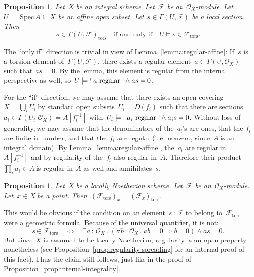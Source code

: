 \documentclass[10pt,reqno,a4paper]{amsbook}
\makeatletter
\theoremstyle{definition}
\theoremstyle{plain}
\newtheorem{prop}[defn]{Proposition}
\theoremstyle{remark}
\newcommand{\F}{\mathcal{F}}
\renewcommand{\O}{\mathcal{O}}
\let\oldul\ul
\renewcommand{\ul}[1]{\text{\oldul{$#1$}}}
\newcommand{\tors}{\mathrm{tors}}
\DeclareMathOperator{\Spec}{Spec}
\newcommand{\?}{\,{:}\,}
\renewcommand{\_}{\mathpunct{.}\,}
\newcommand{\speak}[1]{\ulcorner\text{\textnormal{#1}}\urcorner}
\newcommand{\ie}{i.\,e.\@\xspace}
\renewenvironment{proof}[1][\proofname]{\par
  \pushQED{\qed}%
  \normalfont \topsep6\p@\@plus6\p@\relax
  \trivlist
  \item[\hskip\labelsep
        \itshape
    #1\@addpunct{.}]\ignorespaces
}{%
  \popQED\endtrivlist\@endpefalse
}
\makeatother
\begin{document}
\begin{prop}\label{prop:torsion-int-ext}Let~$X$ be an integral scheme. Let~$\F$ be an~$\O_X$-module. Let~$U
= \Spec A \subseteq X$ be an affine open subset. Let~$s \in \Gamma(U,\F)$ be a local
section. Then
\[ s \in \Gamma(U,\F)_\tors \quad\text{if and only if}\quad
  U \models s \in \F_\tors. \]
\end{prop}
\begin{proof}
The ``only if'' direction is trivial in view of
Lemma~\ref{lemma:regular-affine}: If~$s$ is a torsion element
of~$\Gamma(U,\F)$, there exists a regular element~$a \in \Gamma(U,\O_X)$ such
that~$as = 0$. By the lemma, this element is regular from the internal
perspective as well, so~$U \models \speak{$a$ regular} \wedge as = 0$.

For the ``if'' direction, we may assume that there exists an open covering~$X =
\bigcup_i U_i$ by standard open subsets~$U_i = D(f_i)$ such that there are
sections~$a_i \in \Gamma(U_i,\O_X) = A[f_i^{-1}]$ with~$U_i \models \speak{$a_i$ regular}
\wedge a_i s = 0$. Without loss of generality, we may assume that the
denominators of the~$a_i$'s are ones, that the $f_i$ are
finite in number, and that the~$f_i$ are regular (\ie nonzero, since~$A$ is an
integral domain). By Lemma~\ref{lemma:regular-affine}, the~$a_i$ are
regular in~$A[f_i^{-1}]$ and by regularity of the~$f_i$ also regular in~$A$.
Therefore their product~$\prod_i a_i \in A$ is regular in~$A$ as well and
annihilates~$s$.
\end{proof}
%
%
%
%
%
%

\begin{prop}\label{prop:torsion-submodule-stalks}
Let~$X$ be a locally Noetherian scheme. Let~$\F$ be
an~$\O_X$-module. Let~$x \in X$ be a point. Then~$(\F_\tors)_x =
(\F_x)_\tors$.\end{prop}
\begin{proof}This would be obvious if the condition on an element~$s\?\F$ to
belong to~$\F_\tors$ were a geometric formula. Because of the universal
quantifier, it is not:
\[ s \in \F_\tors \quad\Longleftrightarrow\quad
  \exists a\?\O_X\_ (\forall b\?\O_X\_ ab = 0 \Rightarrow b = 0) \wedge as = 0. \]
But since~$X$ is assumed to be locally Noetherian, regularity is an open
property nonetheless (see Proposition~\ref{prop:regularity-spreading} for an
internal proof of this fact). Thus the claim still follows, just like in the
proof of Proposition~\ref{prop:internal-integrality}.
\end{proof}
\end{document}

